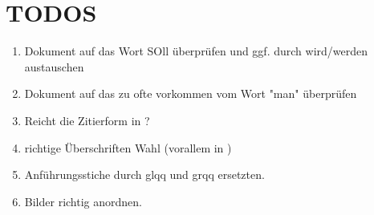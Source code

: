 \documentclass[12pt]{report}           %
\begin{document}


\chapter*{TODOS}
\begin{enumerate}
    \item Dokument auf das Wort SOll überprüfen und ggf. durch wird/werden austauschen
    \item Dokument auf das zu ofte vorkommen vom Wort "man" überprüfen
    \item Reicht die Zitierform in  ?
    \item richtige Überschriften Wahl (vorallem in )
    \item Anführungsstiche durch glqq{} und grqq{} ersetzten.
    \item Bilder richtig anordnen.
\end{enumerate}



\setcounter{page}{1}



\clearpage{}











\baselineskip=14pt


\appendix
\baselineskip=18pt

\end{document}
